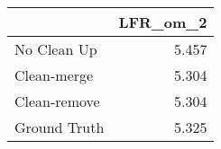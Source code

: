 \begin{tabular}{lr}
\toprule
{} & LFR_om_2 \\
\midrule
No Clean Up  &    5.457 \\
Clean-merge  &    5.304 \\
Clean-remove &    5.304 \\
Ground Truth &    5.325 \\
\bottomrule
\end{tabular}
